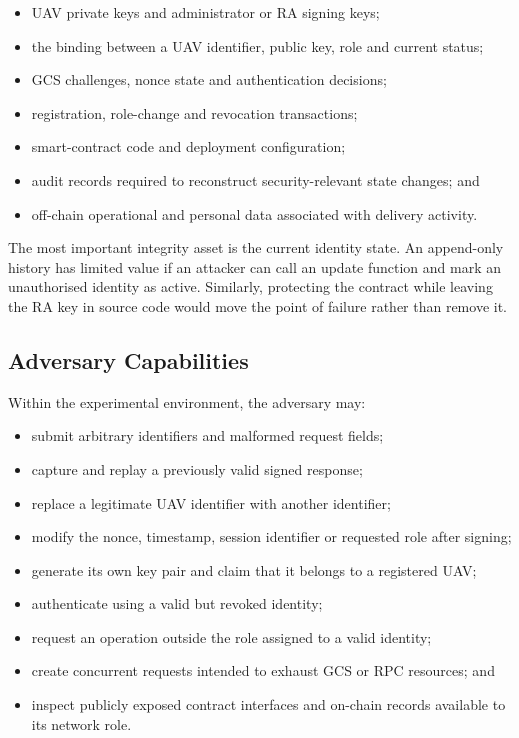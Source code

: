 \begin{itemize}
    \item UAV private keys and administrator or RA signing keys;
    \item the binding between a UAV identifier, public key, role and current status;
    \item GCS challenges, nonce state and authentication decisions;
    \item registration, role-change and revocation transactions;
    \item smart-contract code and deployment configuration;
    \item audit records required to reconstruct security-relevant state changes; and
    \item off-chain operational and personal data associated with delivery activity.
\end{itemize}

The most important integrity asset is the current identity state. An append-only history has limited value if an attacker can call an update function and mark an unauthorised identity as active. Similarly, protecting the contract while leaving the RA key in source code would move the point of failure rather than remove it.

\subsection{Adversary Capabilities}
\label{subsec:adversary-capabilities}

Within the experimental environment, the adversary may:

\begin{itemize}
    \item submit arbitrary identifiers and malformed request fields;
    \item capture and replay a previously valid signed response;
    \item replace a legitimate UAV identifier with another identifier;
    \item modify the nonce, timestamp, session identifier or requested role after signing;
    \item generate its own key pair and claim that it belongs to a registered UAV;
    \item authenticate using a valid but revoked identity;
    \item request an operation outside the role assigned to a valid identity;
    \item create concurrent requests intended to exhaust GCS or RPC resources; and
    \item inspect publicly exposed contract interfaces and on-chain records available to its network role.
\end{itemize}

